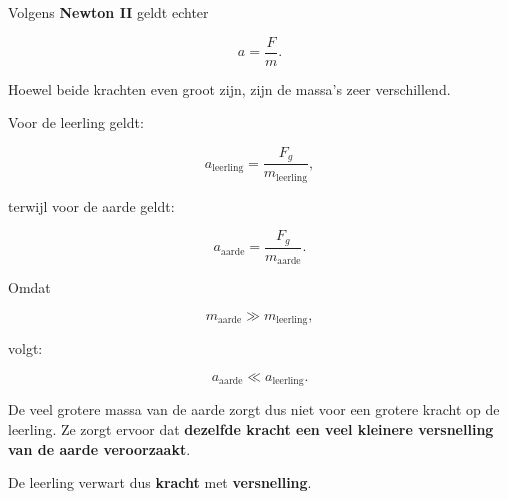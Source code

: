 \documentclass{ximera}
\begin{document}
\begin{oefening}{\oefU\ESS}
\begin{oplossing}
\begin{center}
      \end{center}
      
      Volgens \textbf{Newton II} geldt echter
      
      \[
      a=\frac{F}{m}.
      \]
      
      Hoewel beide krachten even groot zijn, zijn de massa's zeer
      verschillend.
      
      Voor de leerling geldt:
      
      \[
      a_{\mathrm{leerling}}
      =
      \frac{F_g}{m_{\mathrm{leerling}}},
      \]
      
      terwijl voor de aarde geldt:
      
      \[
      a_{\mathrm{aarde}}
      =
      \frac{F_g}{m_{\mathrm{aarde}}}.
      \]
      
      Omdat
      
      \[
      m_{\mathrm{aarde}}\gg m_{\mathrm{leerling}},
      \]
      
      volgt:
      
      \[
      \boxed{
      a_{\mathrm{aarde}}\ll a_{\mathrm{leerling}}.
      }
      \]
      
      De veel grotere massa van de aarde zorgt dus niet voor een grotere
      kracht op de leerling. Ze zorgt ervoor dat \textbf{dezelfde kracht
      een veel kleinere versnelling van de aarde veroorzaakt}.
      
      De leerling verwart dus \textbf{kracht} met \textbf{versnelling}.
      
      \end{oplossing}

\end{oefening}
\end{document}
